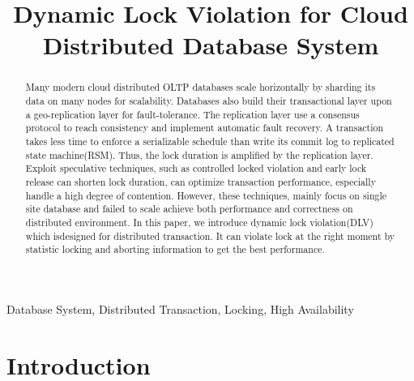 \documentclass[conference]{IEEEtran}
\begin{document}
\title{Dynamic Lock Violation for Cloud Distributed Database System}


\author{
\and
{}
}

\maketitle

\begin{abstract}
Many modern cloud distributed OLTP databases scale horizontally by sharding its data on many nodes for scalability.
Databases also build their transactional layer upon a geo-replication layer for fault-tolerance.
The replication layer use a consensus protocol to reach consistency and implement automatic fault recovery.
A transaction takes less time to enforce a serializable schedule than write its commit log to replicated state machine(RSM). 
Thus, the lock duration is amplified by the replication layer.
Exploit speculative techniques, such as controlled locked violation and early lock release can shorten lock duration, can optimize transaction performance, especially handle a high degree of contention.
However, these techniques, mainly focus on single site database and failed to scale achieve both performance and correctness on distributed environment.
In this paper, we introduce dynamic lock violation(DLV) which isdesigned for distributed transaction.
It can violate lock at the right moment by statistic locking and aborting information to get the best performance.


\end{abstract}

\begin{IEEEkeywords}
Database System, Distributed Transaction, Locking, High Availability
\end{IEEEkeywords}

\section{Introduction}
\end{document}
